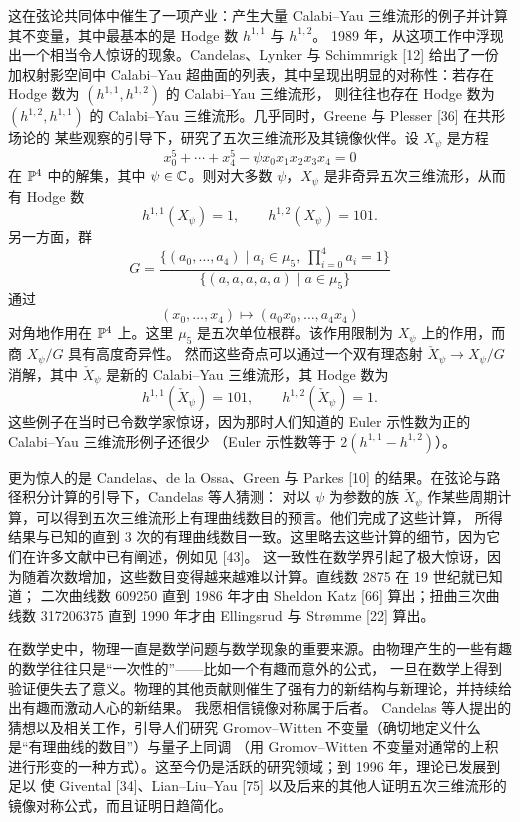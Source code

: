 这在弦论共同体中催生了一项产业：产生大量 Calabi--Yau 三维流形的例子并计算其不变量，其中最基本的是 Hodge 数 $h^{1,1}$ 与 $h^{1,2}$。
1989 年，从这项工作中浮现出一个相当令人惊讶的现象。Candelas、Lynker 与 Schimmrigk [12] 给出了一份加权射影空间中
Calabi--Yau 超曲面的列表，其中呈现出明显的对称性：若存在 Hodge 数为 $(h^{1,1},h^{1,2})$ 的 Calabi--Yau 三维流形，
则往往也存在 Hodge 数为 $(h^{1,2},h^{1,1})$ 的 Calabi--Yau 三维流形。几乎同时，Greene 与 Plesser [36] 在共形场论的
某些观察的引导下，研究了五次三维流形及其镜像伙伴。设 $X_\psi$ 是方程
\[
  x_0^5+\cdots+x_4^5-\psi x_0x_1x_2x_3x_4=0
\]
在 $\mathbb{P}^4$ 中的解集，其中 $\psi\in\mathbb{C}$。则对大多数 $\psi$，$X_\psi$ 是非奇异五次三维流形，从而有 Hodge 数
\[
  h^{1,1}(X_\psi)=1,\qquad h^{1,2}(X_\psi)=101 .
\]
另一方面，群
\[
  G=\frac{\{(a_0,\dots,a_4)\mid a_i\in\mu_5,\ \prod_{i=0}^{4}a_i=1\}}
          {\{(a,a,a,a,a)\mid a\in\mu_5\}}
\]
通过
\[
  (x_0,\dots,x_4)\mapsto (a_0x_0,\dots,a_4x_4)
\]
对角地作用在 $\mathbb{P}^4$ 上。这里 $\mu_5$ 是五次单位根群。该作用限制为 $X_\psi$ 上的作用，而商 $X_\psi/G$ 具有高度奇异性。
然而这些奇点可以通过一个双有理态射 $\check X_\psi\to X_\psi/G$ 消解，其中 $\check X_\psi$ 是新的 Calabi--Yau 三维流形，其 Hodge 数为
\[
  h^{1,1}(\check X_\psi)=101,\qquad h^{1,2}(\check X_\psi)=1 .
\]
这些例子在当时已令数学家惊讶，因为那时人们知道的 Euler 示性数为正的 Calabi--Yau 三维流形例子还很少
（Euler 示性数等于 $2(h^{1,1}-h^{1,2})$）。

更为惊人的是 Candelas、de la Ossa、Green 与 Parkes [10] 的结果。在弦论与路径积分计算的引导下，Candelas 等人猜测：
对以 $\psi$ 为参数的族 $\check X_\psi$ 作某些周期计算，可以得到五次三维流形上有理曲线数目的预言。他们完成了这些计算，
所得结果与已知的直到 3 次的有理曲线数目一致。这里略去这些计算的细节，因为它们在许多文献中已有阐述，例如见 [43]。
这一致性在数学界引起了极大惊讶，因为随着次数增加，这些数目变得越来越难以计算。直线数 2875 在 19 世纪就已知道；
二次曲线数 609250 直到 1986 年才由 Sheldon Katz [66] 算出；扭曲三次曲线数 317206375 直到 1990 年才由 Ellingsrud 与 Strømme [22] 算出。

在数学史中，物理一直是数学问题与数学现象的重要来源。由物理产生的一些有趣的数学往往只是“一次性的”——比如一个有趣而意外的公式，
一旦在数学上得到验证便失去了意义。物理的其他贡献则催生了强有力的新结构与新理论，并持续给出有趣而激动人心的新结果。
我愿相信镜像对称属于后者。
Candelas 等人提出的猜想以及相关工作，引导人们研究 Gromov--Witten 不变量（确切地定义什么是“有理曲线的数目”）与量子上同调
（用 Gromov--Witten 不变量对通常的上积进行形变的一种方式）。这至今仍是活跃的研究领域；到 1996 年，理论已发展到足以
使 Givental [34]、Lian--Liu--Yau [75] 以及后来的其他人证明五次三维流形的镜像对称公式，而且证明日趋简化。

